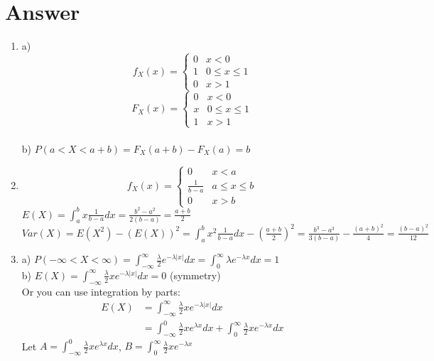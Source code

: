 \documentclass[11pt]{article}
\begin{document}
\section{Answer}
\begin{enumerate}
  \item a) 
  \begin{equation*}
    f_X(x) = \begin{cases}
      0 & x < 0 \\
      1 & 0 \leq x \leq 1 \\
      0 & x > 1
    \end{cases}
  \end{equation*}
  \begin{equation*}
    F_X(x) = \begin{cases}
      0 & x < 0 \\
      x & 0 \leq x \leq 1 \\
      1 & x > 1
    \end{cases}
  \end{equation*}
  \\ b) $P(a < X < a + b) = F_X(a + b) - F_X(a) = b$
  \item 
  \begin{equation*}
    f_X(x) = \begin{cases}
      0 & x < a \\
      \frac{1}{b-a} & a \leq x \leq b \\
      0 & x > b
    \end{cases}
  \end{equation*}
  $E(X) = \int_{a}^{b} x\frac{1}{b-a} dx = \frac{b^2 - a^2}{2(b-a)} = \frac{a+b}{2}$ \\
  $Var(X) = E(X^2) - (E(X))^2 = \int_{a}^{b} x^2\frac{1}{b-a} dx - (\frac{a+b}{2})^2 = \frac{b^3 - a^3}{3(b-a)} - \frac{(a+b)^2}{4}= \frac{(b-a)^2}{12}$
  \item a) $P(-\infty < X < \infty) = \int_{-\infty}^{\infty} \frac{\lambda}{2} e^{-\lambda |x|}dx =\int_{0}^{\infty}\lambda e^{-\lambda x}dx = 1$ \\
  b) $E(X) = \int_{-\infty}^{\infty}\frac{\lambda}{2} xe^{-\lambda |x|}dx = 0$ (symmetry) \\
  \noindent Or you can use integration by parts:
  \begin{align*}
    E(X) &= \int_{-\infty}^{\infty}\frac{\lambda}{2} xe^{-\lambda |x|}dx \\
    &= \int_{-\infty}^{0}\frac{\lambda}{2} xe^{\lambda x}dx + \int_{0}^{\infty}\frac{\lambda}{2} xe^{-\lambda x}dx 
    \end{align*}
    Let $A =  \int_{-\infty}^{0}\frac{\lambda}{2} xe^{\lambda x}dx$, $B = \int_{0}^{\infty}\frac{\lambda}{2} xe^{-\lambda x}$
    

\end{enumerate}
\end{document}
